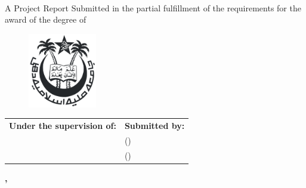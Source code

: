 \begin{titlepage}
    \begin{center}
        \begin{chaptersize}
            \textbf{\projectTitle{}}\\[\baselineskip]
        \end{chaptersize}
        \begin{sectionsize}
            A Project Report\linebreak
            Submitted in the partial fulfillment of the requirements for the award of the degree of\\[\baselineskip]
        \end{sectionsize}
        \begin{chaptersize}
            \textbf{\degreeName{}}
        \end{chaptersize}

        \vspace{20mm}
        \begin{figure}[H]
            \centering
            \includegraphics[width=30mm]{img/jmi.png}
        \end{figure}
        \vspace{20mm}

        \begin{sectionsize}
            \begin{center}
                \begin{tabularx}{\textwidth}{L R}
                    \textbf{Under the supervision of:} & \textbf{Submitted by:}\\
                    \mentorName{}                      & \authorAshhar{} (\authorAshharRoll{})\\
                    \mentorJobTitle{}                  & \authorAdeela{} (\authorAdeelaRoll{})
                \end{tabularx}
            \end{center}

            \vfill

            \textbf{%
                \departmentName{}\linebreak
                \facultyName{}\linebreak
                \collegeName{}, \cityNamePin{}
            }
        \end{sectionsize}
    \end{center}
\end{titlepage}

